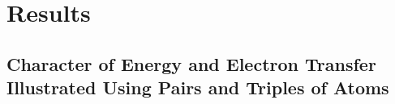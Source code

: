 \chapter{Results}



\section{Character of Energy and Electron Transfer Illustrated Using Pairs and Triples of Atoms}


